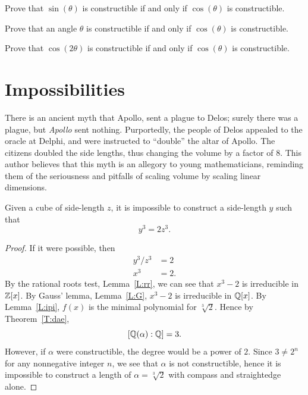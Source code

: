 \documentclass{ximera}
\begin{document}
\begin{exercise}
  Prove that $\sin(\theta)$ is constructible if and only if
  $\cos(\theta)$ is constructible.
\end{exercise}

\begin{exercise}
  Prove that an angle $\theta$ is constructible if and only if
  $\cos(\theta)$ is constructible.
\end{exercise}

\begin{exercise}
  Prove that $\cos(2\theta)$ is constructible if and only if
  $\cos(\theta)$ is constructible.
\end{exercise}

\section{Impossibilities}


There is an ancient myth that Apollo, sent a plague to Delos; surely
there was a plague, but \textit{Apollo} sent nothing. Purportedly, the
people of Delos appealed to the oracle at Delphi, and were instructed
to ``double'' the altar of Apollo. The citizens doubled the side
lengths, thus changing the volume by a factor of $8$. This author
believes that this myth is an allegory to young mathematicians,
reminding them of the seriousness and pitfalls of scaling volume by
scaling linear dimensions.


\begin{example}
Given a cube of side-length $z$, it is impossible to construct a
side-length $y$ such that
\[
y^3 = 2 z^3.
\]
\begin{proof}
  If it were possible, then
  \begin{align*}
    y^3/z^3 &= 2\\
    x^3 &= 2.
  \end{align*}
  By the rational roots test, Lemma~\ref{L:rr}, we can see that $x^3-2$
  is irreducible in $\mathbb Z[x]$. By Gauss' lemma, Lemma~\ref{L:G}, $x^3-2$
  is irreducible in $\mathbb Q[x]$. By Lemma~\ref{L:ipi}, $f(x)$ is the minimal
  polynomial for $\sqrt[3]{2}$. Hence by Theorem~\ref{T:dae},
  \[
    [\mathbb Q(\alpha):\mathbb Q]=3.
    \]
    However, if $\alpha$ were constructible, the
    degree would be a power of $2$. Since $3\ne 2^n$ for any nonnegative
    integer $n$, we see that $\alpha$ is not constructible, hence it is
    impossible to construct a length of $\alpha = \sqrt[3]{2}$ with
    compass and straightedge alone.
\end{proof}
\end{example}
\end{document}
